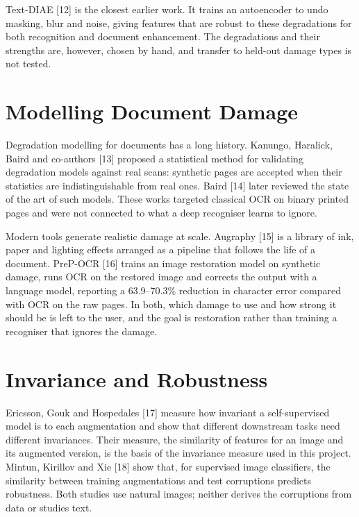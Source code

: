\documentclass[
  12pt,
  a4paper,
]{report}
\begin{document}
Text-DIAE {[}12{]} is the closest earlier work. It trains an autoencoder
to undo masking, blur and noise, giving features that are robust to
these degradations for both recognition and document enhancement. The
degradations and their strengths are, however, chosen by hand, and
transfer to held-out damage types is not tested.

\section{Modelling Document Damage}\label{modelling-document-damage}

Degradation modelling for documents has a long history. Kanungo,
Haralick, Baird and co-authors {[}13{]} proposed a statistical method
for validating degradation models against real scans: synthetic pages
are accepted when their statistics are indistinguishable from real ones.
Baird {[}14{]} later reviewed the state of the art of such models. These
works targeted classical OCR on binary printed pages and were not
connected to what a deep recogniser learns to ignore.

Modern tools generate realistic damage at scale. Augraphy {[}15{]} is a
library of ink, paper and lighting effects arranged as a pipeline that
follows the life of a document. PreP-OCR {[}16{]} trains an image
restoration model on synthetic damage, runs OCR on the restored image
and corrects the output with a language model, reporting a 63.9--70.3\%
reduction in character error compared with OCR on the raw pages. In
both, which damage to use and how strong it should be is left to the
user, and the goal is restoration rather than training a recogniser that
ignores the damage.

\section{Invariance and Robustness}\label{invariance-and-robustness}

Ericsson, Gouk and Hospedales {[}17{]} measure how invariant a
self-supervised model is to each augmentation and show that different
downstream tasks need different invariances. Their measure, the
similarity of features for an image and its augmented version, is the
basis of the invariance measure used in this project. Mintun, Kirillov
and Xie {[}18{]} show that, for supervised image classifiers, the
similarity between training augmentations and test corruptions predicts
robustness. Both studies use natural images; neither derives the
corruptions from data or studies text.
\end{document}
